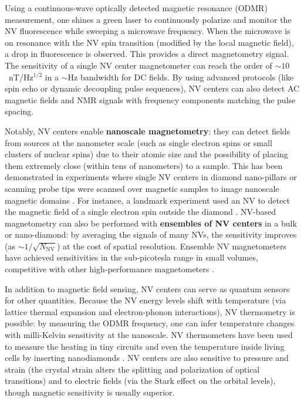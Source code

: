 Using a continuous-wave optically detected magnetic resonance (ODMR)
measurement, one shines a green laser to continuously polarize and
monitor the NV fluorescence while sweeping a microwave frequency. When
the microwave is on resonance with the NV spin transition (modified by
the local magnetic field), a drop in fluorescence is observed. This
provides a direct magnetometry signal. The sensitivity of a single NV
center magnetometer can reach the order of $\sim 10$~nT/Hz$^{1/2}$ in
a $\sim$Hz bandwidth for DC fields. By using advanced protocols (like
spin echo or dynamic decoupling pulse sequences), NV centers can also
detect AC magnetic fields and NMR signals with frequency components
matching the pulse spacing.



Notably, NV centers enable \textbf{nanoscale magnetometry}: they can
detect fields from sources at the nanometer scale (such as single
electron spins or small clusters of nuclear spins) due to their atomic
size and the possibility of placing them extremely close (within tens
of nanometers) to a sample. This has been demonstrated in experiments
where single NV centers in diamond nano-pillars or scanning probe tips
were scanned over magnetic samples to image nanoscale magnetic domains
. For instance, a landmark experiment used an NV to detect the
magnetic field of a single electron spin outside the diamond
. NV-based magnetometry can also be performed with \textbf{ensembles
  of NV centers} in a bulk or nano-diamond: by averaging the signals
of many NVs, the sensitivity improves (as $\sim
1/\sqrt{N_{\text{NV}}}$) at the cost of spatial resolution. Ensemble
NV magnetometers have achieved sensitivities in the sub-picotesla
range in small volumes, competitive with other high-performance
magnetometers .



In addition to magnetic field sensing, NV centers can serve as quantum
sensors for other quantities. Because the NV energy levels shift with
temperature (via lattice thermal expansion and electron-phonon
interactions), NV thermometry is possible: by measuring the ODMR
frequency, one can infer temperature changes with milli-Kelvin
sensitivity at the nanoscale. NV thermometers have been used to
measure the heating in tiny circuits and even the temperature inside
living cells by inserting nanodiamonds . NV centers are also sensitive
to pressure and strain (the crystal strain alters the splitting and
polarization of optical transitions) and to electric fields (via the
Stark effect on the orbital levels), though magnetic sensitivity is
usually superior.



